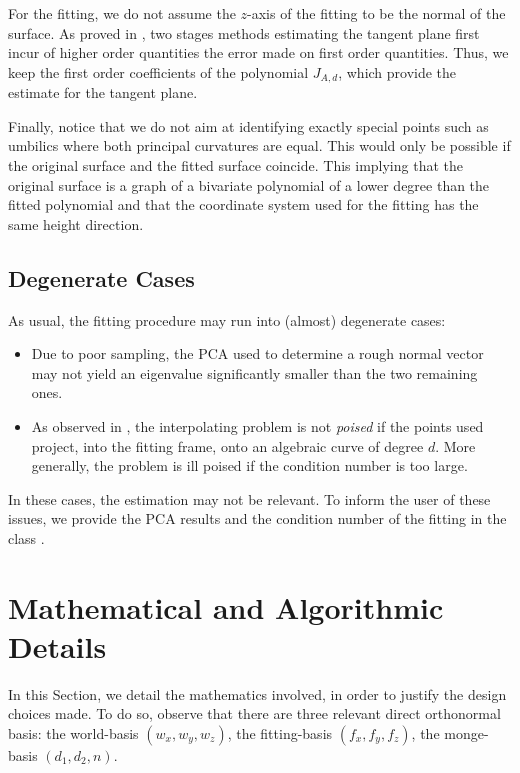 For the fitting, we do not assume the $z$-axis of the fitting to be
the normal of the surface. 
As proved in \cite{cgal:cp-edqpf-05}, two stages methods estimating
the tangent plane first incur of higher order quantities the error
made on first order quantities.
Thus, we keep the first order coefficients of the polynomial
$J_{A,d}$, which provide the estimate for the tangent plane.

Finally, notice that we do not aim at identifying exactly special
points such as umbilics where both principal curvatures are
equal. This would only be possible if the original surface and the
fitted surface coincide. This implying that the original surface is a
graph of a bivariate polynomial of a lower degree than the fitted
polynomial and that the coordinate system used for the fitting has the
same height direction.


\subsection{Degenerate Cases}
\label{sec:deg-cases}

As usual, the  fitting procedure may run into (almost) degenerate
cases:
\begin{itemize}
\item
Due to poor sampling, the PCA used to determine a rough normal vector
may not yield an eigenvalue significantly smaller than the two
remaining ones.

\item
As observed in \cite{cgal:cp-edqpf-05}, the interpolating problem is
not {\em poised} if the points used project, into the fitting frame,
onto an algebraic curve of degree $d$. More generally, the problem is
ill poised if the condition number is too large.
\end{itemize}
In these cases, the estimation may not be relevant. To inform the user
of these issues, we provide the PCA results and the condition number
of the fitting in the class .

\section{Mathematical and Algorithmic Details}

In this Section, we detail the mathematics involved, in order to
justify the design choices made.
To do so, observe that there are three relevant direct orthonormal
basis: the world-basis $(w_x,w_y,w_z)$, the fitting-basis
$(f_x,f_y,f_z)$, the monge-basis $(d_1,d_2,n)$.

